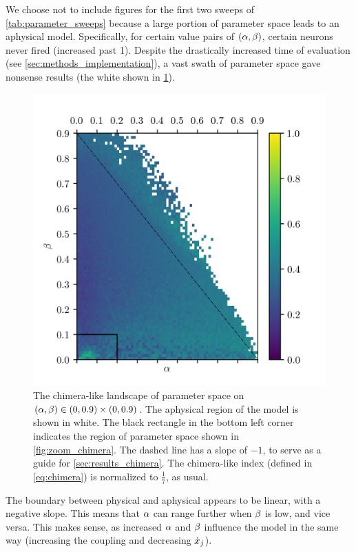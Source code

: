 We choose not to include figures for the first two sweeps of \cref{tab:parameter_sweeps} because a large portion of parameter space leads to an aphysical model.
Specifically, for certain value pairs of $\pqty{\hra, \hrb}$, certain neurons never fired (increased past 1).
Despite the drastically increased time of evaluation (see \cref{sec:methods_implementation}), a vast swath of parameter space gave nonsense results (the white shown in \cref{fig:aphysical_chimera}).
\begin{figure}[ht]
  \centering
  \includegraphics{figure/aphysical_chimera}
  \caption[Chimera-like index landscape]{
    The chimera-like landscape of parameter space on $\pqty{\hra, \hrb} \in \pqty{0, 0.9} \times \pqty{0, 0.9}$.
    The aphysical region of the model is shown in white.
    The black rectangle in the bottom left corner indicates the region of parameter space shown in \cref{fig:zoom_chimera}.
    The dashed line has a slope of $-1$, to serve as a guide for \cref{sec:results_chimera}.
    The chimera-like index (defined in \cref{eq:chimera}) is normalized to $\frac{1}{7}$, as usual.
  }
  \label{fig:aphysical_chimera}
\end{figure}
The boundary between physical and aphysical appears to be linear, with a negative slope.
This means that $\alpha$ can range further when $\beta$ is low,
and vice versa.
This makes sense, as increased $\alpha$ and $\beta$ influence the model in the same way (increasing the coupling and decreasing $\dot{x}_{j}$).

